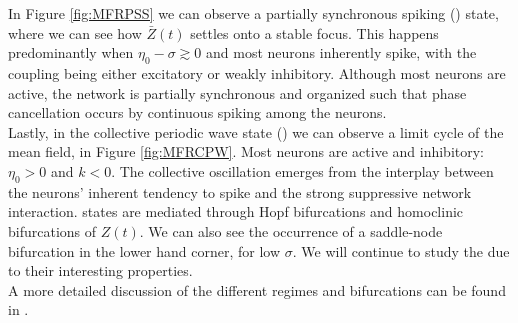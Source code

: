 In Figure \ref{fig:MFRPSS} we can observe a partially synchronous spiking (\PSS) state, where we can see how $\bar{Z}(t)$ settles onto a stable focus. This happens predominantly when $\eta_0 - \sigma \gtrsim 0$ and most neurons inherently spike, with the coupling being either excitatory or weakly inhibitory. Although most neurons are active, the network is partially synchronous and organized such that phase cancellation occurs by continuous spiking among the neurons.\\

Lastly, in the collective periodic wave state (\CPW) we can observe a limit cycle of the mean field, in Figure \ref{fig:MFRCPW}. Most neurons are active and inhibitory: $\eta_0 > 0$ and $k < 0$. The collective oscillation emerges from the interplay between the neurons’ inherent tendency to spike and the strong suppressive network interaction. \CPW states are mediated through Hopf bifurcations and homoclinic bifurcations of $Z(t)$. We can also see the occurrence of a saddle-node bifurcation in the lower hand corner, for low $\sigma$. We will continue to study the \CPW due to their interesting properties.\\
A more detailed discussion of the different regimes and bifurcations can be found in \cite{Luke2013}.

